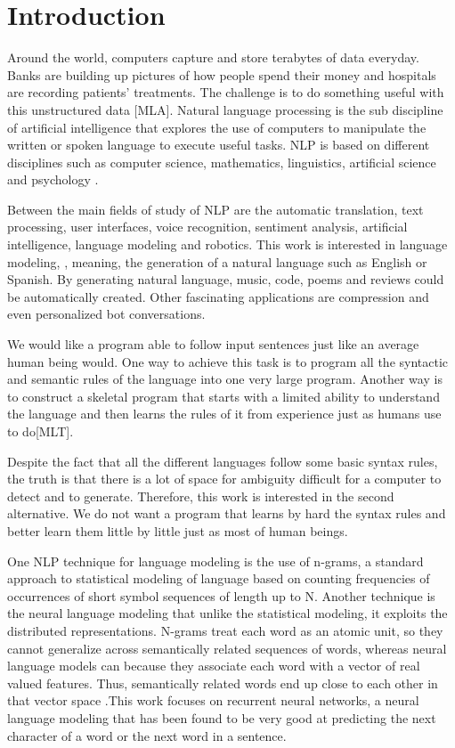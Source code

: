 \chapter{Introduction}
\label{ch:intro1}

Around the world, computers capture and store terabytes of data everyday. Banks are building up pictures of how people spend their money and hospitals are recording patients' treatments. The challenge is to do something useful with this unstructured data [MLA].  Natural language processing is the sub discipline of artificial intelligence that explores the use of computers to manipulate the written or spoken language to execute useful tasks. NLP is based on different disciplines such as computer science, mathematics, linguistics, artificial science and psychology \cite{chowdhury2003natural}.

Between the main fields of study of NLP are the automatic translation, text processing, user interfaces, voice recognition, sentiment analysis, artificial intelligence, language modeling and robotics. This work is interested in  language modeling, , meaning, the generation of a natural language such as English or Spanish. By generating natural language, music, code, poems and reviews could be automatically created. Other fascinating applications are compression and even personalized bot conversations. 

We would like a program able to follow input sentences just like an average human being would. One way to achieve this task is to program all the syntactic and semantic rules of the language into one very large program. Another way is to construct a skeletal program that starts with a limited ability to understand the language and then learns the rules of it from experience just as humans use to do[MLT].  

Despite the fact that all the different languages follow some basic syntax rules, the truth is that there is a lot of space for ambiguity difficult for a computer to detect and to generate. Therefore, this work is interested in the second alternative. We do not want a program that learns by hard the syntax rules and better learn them little by little just as most of human beings. 

One NLP technique for language modeling is the use of n-grams, a standard approach to statistical modeling of language based on counting frequencies of occurrences of short symbol sequences of length up to N. Another technique is the neural language modeling that unlike the statistical modeling, it exploits the  distributed representations. N-grams treat each word as an atomic unit, so they cannot generalize across semantically related sequences of words, whereas neural language models can because they associate each word with a vector of real valued features. Thus, semantically related words end up close to each other in that vector space  \cite{lecun2015deep} .This work focuses on recurrent neural networks, a neural language modeling that has been found to be very good at predicting the next character of a word or the next word in a sentence.

